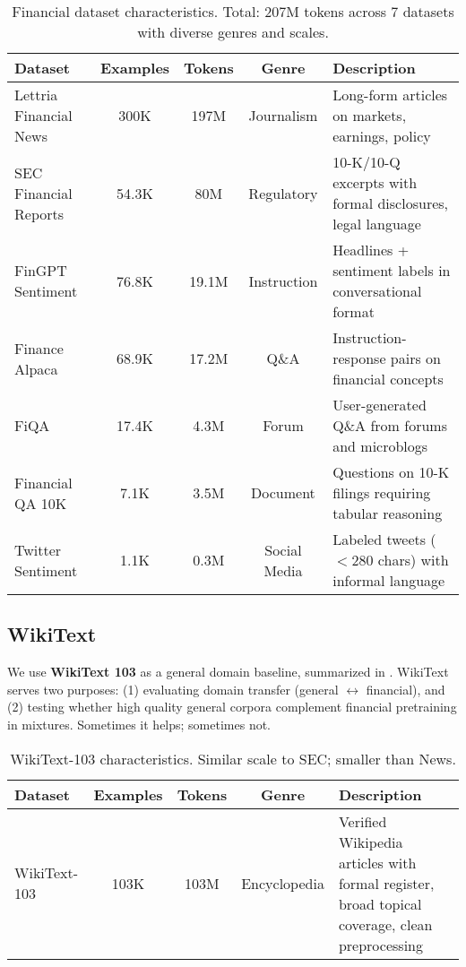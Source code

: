 \begin{table}[h]
\centering
\caption[Financial Dataset Characteristics]{Financial dataset characteristics. Total: 207M tokens across 7 datasets with diverse genres and scales.}
\label{tab:financial_datasets}
\small
\begin{tabular}{p{3cm}cccp{5.5cm}}
\toprule
\textbf{Dataset} & \textbf{Examples} & \textbf{Tokens} & \textbf{Genre} & \textbf{Description} \\
\midrule
Lettria Financial News & 300K & 197M & Journalism & Long-form articles on markets, earnings, policy \\
\midrule
SEC Financial Reports & 54.3K & 80M & Regulatory & 10-K/10-Q excerpts with formal disclosures, legal language \\
\midrule
FinGPT Sentiment & 76.8K & 19.1M & Instruction & Headlines + sentiment labels in conversational format \\
\midrule
Finance Alpaca & 68.9K & 17.2M & Q\&A & Instruction-response pairs on financial concepts \\
\midrule
FiQA & 17.4K & 4.3M & Forum & User-generated Q\&A from forums and microblogs \\
\midrule
Financial QA 10K & 7.1K & 3.5M & Document & Questions on 10-K filings requiring tabular reasoning \\
\midrule
Twitter Sentiment & 1.1K & 0.3M & Social Media & Labeled tweets ($<$280 chars) with informal language \\
\bottomrule
\end{tabular}
\end{table}

\subsection{WikiText}

We use \textbf{WikiText 103} \parencite{merity2016pointer} as a general domain baseline, summarized in . WikiText serves two purposes: (1) evaluating domain transfer (general $\leftrightarrow$ financial), and (2) testing whether high quality general corpora complement financial pretraining in mixtures. Sometimes it helps; sometimes not.

\begin{table}[h]
\centering
\caption[WikiText Dataset Characteristics]{WikiText-103 characteristics. Similar scale to SEC; smaller than News.}
\label{tab:wikitext_dataset}
\small
\begin{tabular}{p{3cm}cccp{5.5cm}}
\toprule
\textbf{Dataset} & \textbf{Examples} & \textbf{Tokens} & \textbf{Genre} & \textbf{Description} \\
\midrule
WikiText-103 & 103K & 103M & Encyclopedia & Verified Wikipedia articles with formal register, broad topical coverage, clean preprocessing \\
\bottomrule
\end{tabular}
\end{table}

